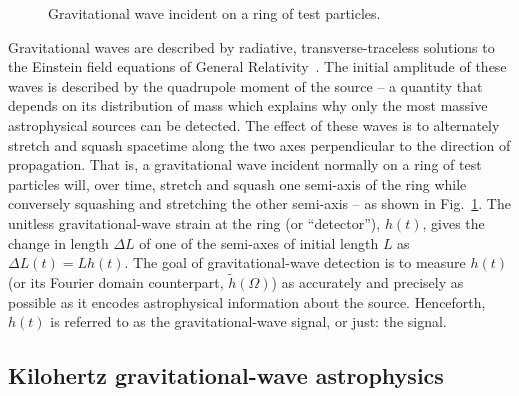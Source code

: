 \begin{figure}
	\centering
	\caption{Gravitational wave incident on a ring of test particles.}
	\label{fig:GW_ring_of_test_particles}
\end{figure}

Gravitational waves are described by radiative, transverse-traceless solutions to the Einstein field equations of General Relativity~\cite{}. %
The initial amplitude of these waves is described by the quadrupole moment of the source -- a quantity that depends on its distribution of mass which explains why only the most massive astrophysical sources can be detected. %
The effect of these waves is to alternately stretch and squash spacetime along the two axes perpendicular to the direction of propagation. That is, a gravitational wave incident normally on a ring of test particles will, over time, stretch and squash one semi-axis of the ring while conversely squashing and stretching the other semi-axis -- as shown in Fig.~\ref{fig:GW_ring_of_test_particles}.
The unitless gravitational-wave strain at the ring (or ``detector''), $h(t)$, gives the change in length $\Delta L$ of one of the semi-axes of initial length $L$ as $\Delta L(t) = L h(t)$. The goal of gravitational-wave detection is to measure $h(t)$ (or its Fourier domain counterpart, $\tilde{h}(\Omega)$) as accurately and precisely as possible as it encodes astrophysical information about the source. Henceforth, $h(t)$ is referred to as the gravitational-wave signal, or just: the signal.



\subsection{Kilohertz gravitational-wave astrophysics} %

